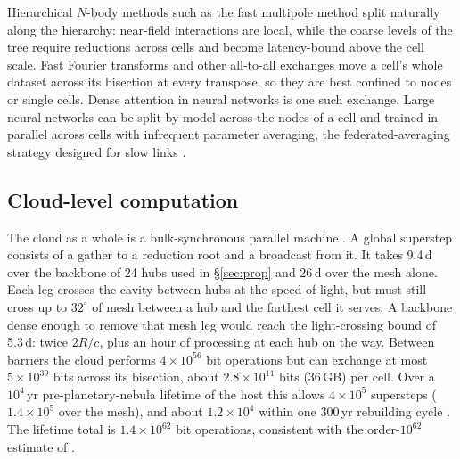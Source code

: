 \documentclass[final,5p]{elsarticle}
\begin{document}
Hierarchical $N$-body methods such as the fast multipole method \citep{Greengard1987} split naturally along the hierarchy: near-field interactions are local, while the coarse levels of the tree require reductions across cells and become latency-bound above the cell scale. Fast Fourier transforms and other all-to-all exchanges move a cell's whole dataset across its bisection at every transpose, so they are best confined to nodes or single cells. Dense attention in neural networks is one such exchange. Large neural networks can be split by model across the nodes of a cell and trained in parallel across cells with infrequent parameter averaging, the federated-averaging strategy designed for slow links \citep{McMahan2016}.

\subsection{Cloud-level computation}\label{sec:cloud}
The cloud as a whole is a bulk-synchronous parallel machine \citep{Valiant1990}. A global superstep consists of a gather to a reduction root and a broadcast from it. It takes 9.4\,d over the backbone of 24 hubs used in \S\ref{sec:prop} and 26\,d over the mesh alone. Each leg crosses the cavity between hubs at the speed of light, but must still cross up to $32^\circ$ of mesh between a hub and the farthest cell it serves. A backbone dense enough to remove that mesh leg would reach the light-crossing bound of 5.3\,d: twice $2R/c$, plus an hour of processing at each hub on the way. Between barriers the cloud performs $4\times10^{56}$ bit operations but can exchange at most $5\times10^{39}$ bits across its bisection, about $2.8\times10^{11}$ bits (36\,GB) per cell. Over a $10^4$\,yr pre-planetary-nebula lifetime of the host \citep{Laughlin2021blog,Gilster2021} this allows $4\times10^5$ supersteps ($1.4\times10^5$ over the mesh), and about $1.2\times10^4$ within one 300\,yr rebuilding cycle \citep{LaughlinAdams2021}. The lifetime total is $1.4\times10^{62}$ bit operations, consistent with the order-$10^{62}$ estimate of \citet{Laughlin2021grab}.
\end{document}
